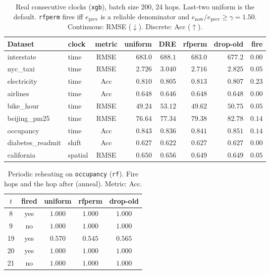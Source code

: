 \begin{table}[ht]\centering
\caption{Real consecutive clocks (\texttt{xgb}), batch size 200,
24 hops. Last-two uniform is the default. \texttt{rfperm} fires
iff $e_{\mathrm{prev}}$ is a reliable denominator and $e_{\mathrm{now}}/e_{\mathrm{prev}}\ge\gamma=1.50$.
Continuous: RMSE ($\downarrow$). Discrete: Acc ($\uparrow$).}
\label{tab:po-refit-real-xgb}
\small
\setlength{\tabcolsep}{3.2pt}
\begin{tabular}{@{}llcrrrrr@{}}\toprule
Dataset & clock & metric & uniform & DRE & rfperm & drop-old & fire \\
\midrule
interstate & time & RMSE & $683.0$ & $688.1$ & $683.0$ & $\mathbf{677.2}$ & $0.00$ \\
nyc\_taxi & time & RMSE & $2.726$ & $3.040$ & $\mathbf{2.716}$ & $2.825$ & $0.05$ \\
electricity & time & Acc & $0.810$ & $0.805$ & $\mathbf{0.813}$ & $0.807$ & $0.23$ \\
airlines & time & Acc & $\mathbf{0.648}$ & $0.646$ & $\mathbf{0.648}$ & $\mathbf{0.648}$ & $0.00$ \\
bike\_hour & time & RMSE & $\mathbf{49.24}$ & $53.12$ & $49.62$ & $50.75$ & $0.05$ \\
beijing\_pm25 & time & RMSE & $\mathbf{76.64}$ & $77.34$ & $79.38$ & $82.78$ & $0.14$ \\
occupancy & time & Acc & $0.843$ & $0.836$ & $0.841$ & $\mathbf{0.851}$ & $0.14$ \\
diabetes\_readmit & shift & Acc & $\mathbf{0.627}$ & $0.622$ & $\mathbf{0.627}$ & $\mathbf{0.627}$ & $0.00$ \\
california & spatial & RMSE & $0.650$ & $0.656$ & $\mathbf{0.649}$ & $\mathbf{0.649}$ & $0.05$ \\
\bottomrule
\end{tabular}
\end{table}

\begin{table}[ht]\centering
\caption{Periodic reheating on \texttt{occupancy} (\texttt{rf}).
Fire hops and the hop after (anneal). Metric: Acc.}
\label{tab:po-refit-periodic-occupancy-rf}
\small
\begin{tabular}{@{}ccccc@{}}\toprule
$t$ & fired & uniform & rfperm & drop-old \\
\midrule
8 & yes & $1.000$ & $1.000$ & $1.000$ \\
9 & no & $1.000$ & $1.000$ & $1.000$ \\
19 & yes & $0.570$ & $0.545$ & $0.565$ \\
20 & yes & $1.000$ & $1.000$ & $1.000$ \\
21 & no & $1.000$ & $1.000$ & $1.000$ \\
\bottomrule
\end{tabular}
\end{table}

